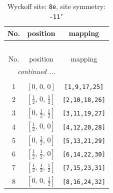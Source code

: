 \documentclass[fleqn,8pt]{jsarticle}
\begin{document}
\renewcommand{\arraystretch}{1.2}
\begin{longtable}{ccc}
\caption{Wyckoff site: {\tt 8e}, site symmetry: {\tt -11'}}
 \\
 \hline \hline
No. & position & mapping \\ \hline \endfirsthead

\multicolumn{2}{l}{\tablename\ \thetable{}} \\
 \hline \hline
No. & position & mapping \\ \hline \endhead

 \hline \hline
\multicolumn{2}{r}{\footnotesize\it continued ...} \\ \endfoot

 \hline \hline
\multicolumn{2}{r}{} \\ \endlastfoot

1 & $\left[ 0,\, 0,\, 0 \right]$ & {\tt [1,9,17,25]} \\ \hline
2 & $\left[ \frac{1}{2},\, 0,\, \frac{1}{2} \right]$ & {\tt [2,10,18,26]} \\ \hline
3 & $\left[ 0,\, \frac{1}{2},\, \frac{1}{2} \right]$ & {\tt [3,11,19,27]} \\ \hline
4 & $\left[ \frac{1}{2},\, 0,\, 0 \right]$ & {\tt [4,12,20,28]} \\ \hline
5 & $\left[ 0,\, \frac{1}{2},\, 0 \right]$ & {\tt [5,13,21,29]} \\ \hline
6 & $\left[ \frac{1}{2},\, \frac{1}{2},\, 0 \right]$ & {\tt [6,14,22,30]} \\ \hline
7 & $\left[ \frac{1}{2},\, \frac{1}{2},\, \frac{1}{2} \right]$ & {\tt [7,15,23,31]} \\ \hline
8 & $\left[ 0,\, 0,\, \frac{1}{2} \right]$ & {\tt [8,16,24,32]} \\
\end{longtable}
\renewcommand{\arraystretch}{1.2}
\end{document}
